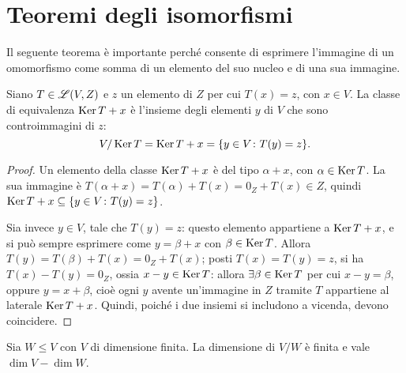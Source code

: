 \section{Teoremi degli isomorfismi}
Il seguente teorema è importante perché consente di esprimere l'immagine di un omomorfismo come somma di un elemento del suo nucleo e di una sua immagine.
\begin{teorema}
	Siano $T\in\mathscr L(V,Z)$ e $  z$ un elemento di $Z$ per cui $T(x)=z$, con $  x\in V$.
	La classe di equivalenza $\operatorname{Ker} T+  x$ è l'insieme degli elementi $  y$ di $V$ che sono controimmagini di $  z$:
	\begin{equation*}
		V/ \operatorname{Ker} T = \operatorname{Ker} T+  x=\{  y\in V\colon T(  y)=  z\}.
	\end{equation*}
\end{teorema}
\begin{proof}
	Un elemento della classe $\operatorname{Ker} T+  x$ è del tipo $\alpha+  x$, con $\alpha\in\operatorname{Ker} T$.
	La sua immagine è $T(\alpha+  x)=T(\alpha)+T(  x)=0_Z+T(  x)\in Z$, quindi $\operatorname{Ker} T+  x\subseteq\{  y\in V\colon T(  y)=  z\}$.

	Sia invece $  y\in V$, tale che $T(  y)=  z$: questo elemento appartiene a $\operatorname{Ker} T+  x$, e si può sempre esprimere come $y=\beta+  x$ con $\beta\in\operatorname{Ker} T$.
	Allora $T(  y)=T(\beta)+T(  x)=0_Z+T(  x)$; posti $T(  x)=T(  y)=  z$, si ha $T(  x)-T(  y)=0_Z$, ossia $  x-  y\in\operatorname{Ker} T$: allora $\exists\beta\in\operatorname{Ker} T$ per cui $  x-  y=\beta$, oppure $  y=  x+\beta$, cioè ogni $  y$ avente un'immagine in $Z$ tramite $T$ appartiene al laterale $\operatorname{Ker} T+  x$.
	Quindi, poiché i due insiemi si includono a vicenda, devono coincidere.
\end{proof}
\begin{teorema} \label{t:dimensione-quoziente}
	Sia $W\leq V$ con $V$ di dimensione finita.
	La dimensione di $V/W$ è finita e vale $\dim V-\dim W$.
\end{teorema}
